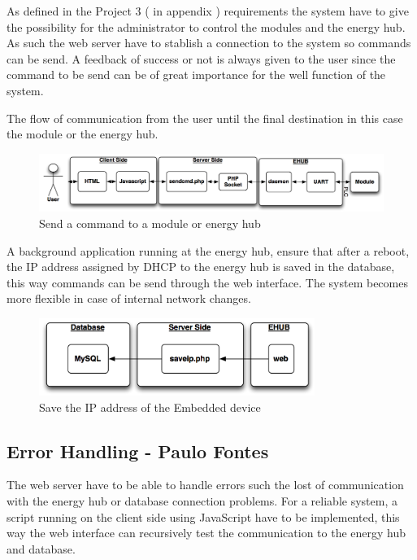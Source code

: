 As defined in the Project 3 ( in appendix ) requirements the system have to give the possibility for the administrator to control the modules and the energy hub. As such the web server have to stablish a connection to the system so commands can be send. A feedback of success or not is always given to the user since the command to be send can be of great importance for the well function of the system.

The flow of communication from the user until the final destination in this case the module or the energy hub.
\begin{figure}[H]
	\begin{centering}
		\includegraphics[width=1\textwidth]{images/sendcmd.png}
		\caption{Send a command to a module or energy hub}
	\end{centering}
\end{figure}

A background application running at the energy hub, ensure that after a reboot, the IP address assigned by DHCP to the energy hub is saved in the database, this way commands can be send through the web interface. The system becomes more flexible in case of internal network changes.
\begin{figure}[H]
	\begin{centering}
		\includegraphics[width=0.8\textwidth]{images/saveip.png}
		\caption{Save the IP address of the Embedded device}
	\end{centering}
\end{figure}

\subsection{Error Handling - Paulo Fontes}
The web server have to be able to handle errors such the lost of communication with the energy hub or database connection problems. For a reliable system, a script running on the client side using JavaScript have to be implemented, this way the web interface can recursively test the communication to the energy hub and database.

